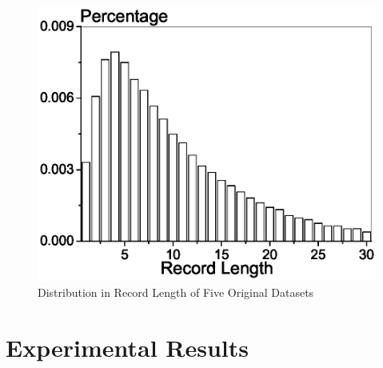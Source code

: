 \begin{figure}[th]
{\begin{minipage}[c]{0.46\textwidth}
  \includegraphics[width=1.0\columnwidth]{retail.eps}
\end{minipage}%
}
\caption{Distribution in Record Length of Five Original Datasets}\label{fig:datasets}
\end{figure}

\section{Experimental Results}
\label{sec:eval}

